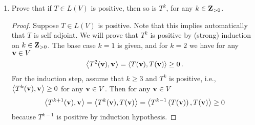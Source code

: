 \documentclass[11pt]{amsart}
\begin{document}
\begin{enumerate}[(1)]
\item Prove that if $T \in L(V)$ is positive, then so is $T^k$, for any $k \in \mathbf{Z}_{ >0 }$.

\begin{proof}
Suppose $T \in L(V)$ is positive. Note that this implies automatically that $T$ is self adjoint.
We will prove that $T^k$ is positive by (strong) induction on $k \in \mathbf{Z}_{ >0 }$.
The base case $k=1$ is given, and for $k=2$ we have for any $\mathbf v \in V$
\[
  \left<  T^2(\mathbf v) ,  \mathbf v  \right>
  = \left<  T(\mathbf v) ,  T(\mathbf v)  \right>
  \ge 0 \, .
\]
For the induction step, assume that $k \ge 3$ and $T^k$ is positive, i.e., $\left<  T^k(\mathbf v) ,  \mathbf v  \right> \ge 0$ for any $\mathbf v \in V$. Then for any $\mathbf v \in V$
\[
  \left<  T^{ k+1 } (\mathbf v) ,  \mathbf v  \right>
  = \left<  T^k(\mathbf v) ,  T(\mathbf v)  \right>
  = \left<  T^{ k-1 } \left( T(\mathbf v) \right) ,  T(\mathbf v)  \right>
  \ge 0
\]
because $T^{ k-1 }$ is positive by induction hypothesis.
\end{proof}

\end{enumerate}
\end{document}
